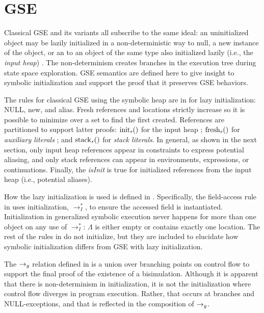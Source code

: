 \section{GSE}
\label{app:gse}
Classical GSE and its variants all subscribe to the same ideal: an uninitialized object may be lazily initialized
in a non-deterministic way to null, a new instance of the object, or an to
an object of the same type also initialized lazily (i.e., the \emph{input heap}) \cite{GSE03,KiasanKunit,Cadar:2008,Rosner:2015}. The
non-determinism creates branches in the execution
tree during state space exploration. GSE semantics are defined here to give insight to symbolic initialization and support the proof that it preserves GSE behaviors. 

The rules for classical GSE using the symbolic heap are in
 for lazy initialization: NULL, new, and alias. Fresh references and locations strictly increase so it is possible to minimize over a set to find the first created. References are partitioned to support latter proofs: $\mathrm{init}_{\emph{r}}()$ for the input
  heap
  ; $\mathrm{fresh}_{\emph{r}}()$ for \emph{auxiliary
  literals}
  ; and $\mathrm{stack}_{\emph{r}}()$ for \emph{stack
    literals}.
  In general, as shown in the next section,
  only input heap references appear in constraints to express potential aliasing, and only stack references can appear in environments, expressions, or continuations.  Finally, the \emph{isInit} is true for initialized references from the input heap (i.e., potential aliases). 

How the lazy
initialization is used is defined in . Specifically,
the field-access rule in  uses initialization,
$\rightarrow_I^*$, to ensure the accessed field is
instantiated. Initialization in generalized symbolic execution never
happens for more than one object on any use of $\rightarrow_I^*$:
$\Lambda$ is either empty or contains exactly one location. The rest of the rules in  do not initialize, but they are included to elucidate how symbolic initialization differs from GSE with lazy initialization. 


The $\rightarrow_{g}$ relation defined in  is a union over branching points on control flow
to support the final proof of the existence of a
bisimulation. Although it is apparent that there is non-determinism in
initialization, it is not the initialization where control flow
diverges in program execution. Rather, that occurs at branches and NULL-exceptions, and that is reflected in the composition of $\rightarrow_{g}$.




